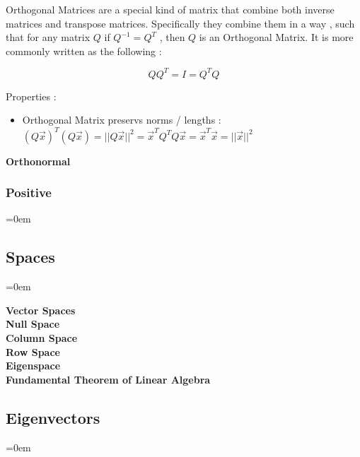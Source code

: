 Orthogonal Matrices are a special kind of matrix that combine both inverse matrices and transpose matrices. Specifically they combine them in a way , such that for any matrix \( Q \) if \( Q^{-1} = Q^{T} \) , then \( Q \) is an Orthogonal Matrix. It is more commonly written as the following :

\[
	QQ^{T} = I = Q^{T}Q
\]

Properties :

\begin{itemize}[noitemsep]

	\item Orthogonal Matrix preservs norms / lengths : \(
		(Q \vec{x})^{T}(Q\vec{x}) = ||Q\vec{x}||^{2} = \vec{x}^{T}Q^{T}Q\vec{x} = \vec{x}^T\vec{x} = ||\vec{x}||^{2}
		\)

\end{itemize}


\textbf{Orthonormal}


\subsubsectionend
\subsubsection{Positive}
\label{sssec:positive}
\parindent=0em



\subsubsectionend

\subsectionend

\subsection{Spaces}
\label{ssec:spaces}
\parindent=0em

\textbf{Vector Spaces} \\
\textbf {Null Space} \\
\textbf {Column Space} \\
\textbf {Row Space} \\
\textbf {Eigenspace} \\
\textbf {Fundamental Theorem of Linear Algebra} \\

\subsectionend

\subsection{Eigenvectors}
\label{ssec:eigenvectors}
\parindent=0em

